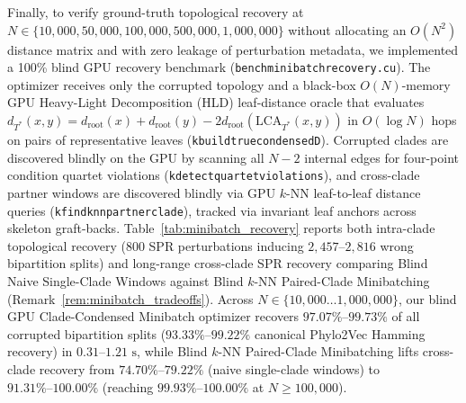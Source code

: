 \documentclass[11pt,a4paper]{article}
\makeatletter
\DeclareRobustCommand{\_}{\ifmmode\nfss@text{\textunderscore}\else\textunderscore\allowbreak\fi}
\theoremstyle{definition}
\makeatother
\begin{document}
Finally, to verify ground-truth topological recovery at $N \in \{10{,}000, 50{,}000, 100{,}000, 500{,}000, 1{,}000{,}000\}$ without allocating an $O(N^2)$ distance matrix and with zero leakage of perturbation metadata, we implemented a 100\% blind GPU recovery benchmark (\texttt{bench\_minibatch\_recovery.cu}). The optimizer receives only the corrupted topology and a black-box $O(N)$-memory GPU Heavy-Light Decomposition (HLD) leaf-distance oracle that evaluates $d_{T^*}(x,y) = d_{\text{root}}(x) + d_{\text{root}}(y) - 2 d_{\text{root}}(\text{LCA}_{T^*}(x,y))$ in $O(\log N)$ hops on pairs of representative leaves (\texttt{k\_build\_true\_condensed\_D}). Corrupted clades are discovered blindly on the GPU by scanning all $N-2$ internal edges for four-point condition quartet violations (\texttt{k\_detect\_quartet\_violations}), and cross-clade partner windows are discovered blindly via GPU $k$-NN leaf-to-leaf distance queries (\texttt{k\_find\_knn\_partner\_clade}), tracked via invariant leaf anchors across skeleton graft-backs. Table~\ref{tab:minibatch_recovery} reports both intra-clade topological recovery ($800$ SPR perturbations inducing $2{,}457\text{--}2{,}816$ wrong bipartition splits) and long-range cross-clade SPR recovery comparing Blind Naive Single-Clade Windows against Blind $k$-NN Paired-Clade Minibatching (Remark~\ref{rem:minibatch_tradeoffs}). Across $N \in \{10{,}000 \dots 1{,}000{,}000\}$, our blind GPU Clade-Condensed Minibatch optimizer recovers $\mathbf{97.07\%\text{--}99.73\%}$ of all corrupted bipartition splits ($\mathbf{93.33\%\text{--}99.22\%}$ canonical Phylo2Vec Hamming recovery) in $0.31\text{--}1.21\text{ s}$, while Blind $k$-NN Paired-Clade Minibatching lifts cross-clade recovery from $74.70\%\text{--}79.22\%$ (naive single-clade windows) to $\mathbf{91.31\%\text{--}100.00\%}$ (reaching $\mathbf{99.93\%\text{--}100.00\%}$ at $N \ge 100{,}000$).
\end{document}
